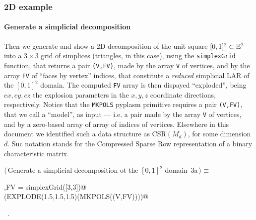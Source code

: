 \documentclass[11pt,oneside]{article}	%
\begin{document}
\subsubsection{2D example}

\paragraph{Generate a simplicial decomposition}
Then we generate and show a 2D decomposition of the unit square $[0,1]^2\subset\mathbb{E}^2$ into a $3\times 3$ grid of simplices (triangles, in this case), using the \texttt{simplexGrid} function, that returns a pair \texttt{(V,FV)}, made by the array \texttt{V} of vertices, and by the array \texttt{FV} of ``faces by vertex'' indices, that constitute a \emph{reduced} simplicial LAR of the $[0,1]^2$ domain. The computed \texttt{FV} array is then dispayed ``exploded'', being $ex,ey,ez$ the explosion parameters in the $x,y,z$ coordinate directions, respectively. Notice that the \texttt{MKPOLS} pyplasm primitive requires a pair \texttt{(V,FV)}, that we call a ``model'', as input --- i.e. a pair made by the array \texttt{V} of vertices, and by a zero-based array of array of indices of vertices. Elsewhere in this document we identified such a data structure as CSR$(M_d)$, for some dimension $d$. Suc notation stands for the Compressed Sparse Row representation of a binary characteristic matrix.

\begin{flushleft} \small
\begin{minipage}{\linewidth} \label{scrap2}
\protect{}$\langle\,$Generate a simplicial decomposition ot the $[0,1]^2$ domain\nobreak\ {\footnotesize 3a}$\,\rangle\equiv$
\vspace{-1ex}
\begin{list}{}{} \item
\mbox{}\verb@V,FV = simplexGrid([3,3])@\\
\mbox{}\verb@VIEW(EXPLODE(1.5,1.5,1.5)(MKPOLS((V,FV))))@\\
\mbox{}\verb@@{\NWsep}
\end{list}
\vspace{-1ex}
\footnotesize\addtolength{\baselineskip}{-1ex}
\begin{list}{}{\setlength{\itemsep}{-\parsep}\setlength{\itemindent}{-\leftmargin}}
\item \NWtxtMacroRefIn\ .
\end{list}
\end{minipage}\\[4ex]
\end{flushleft}
\end{document}
